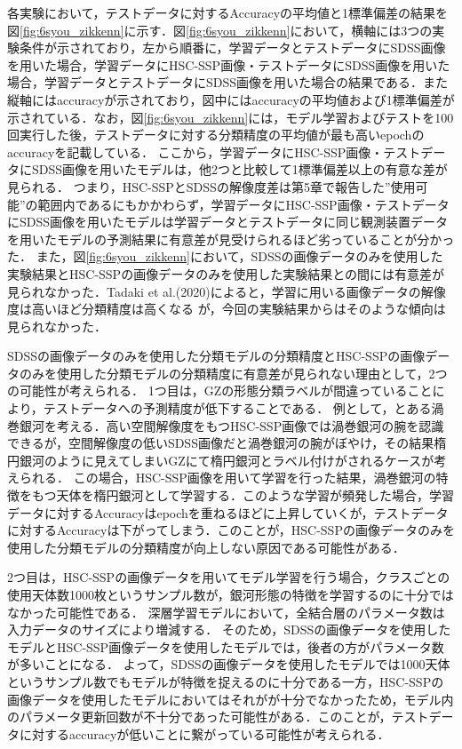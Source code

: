 \documentclass[a4j, 11pt]{jreport}
\begin{document}
各実験において，テストデータに対するAccuracyの平均値と1標準偏差の結果を図\ref{fig:6syou_zikkenn}に示す．図\ref{fig:6syou_zikkenn}において，横軸には3つの実験条件が示されており，左から順番に，学習データとテストデータにSDSS画像を用いた場合，学習データにHSC-SSP画像・テストデータにSDSS画像を用いた場合，学習データとテストデータにSDSS画像を用いた場合の結果である．また縦軸にはaccuracyが示されており，図中にはaccuracyの平均値および1標準偏差が示されている．なお，図\ref{fig:6syou_zikkenn}には，モデル学習およびテストを100回実行した後，テストデータに対する分類精度の平均値が最も高いepochのaccuracyを記載している．
ここから，学習データにHSC-SSP画像・テストデータにSDSS画像を用いたモデルは，他2つと比較して1標準偏差以上の有意な差が見られる．
つまり，HSC-SSPとSDSSの解像度差は第5章で報告した''使用可能''の範囲内であるにもかかわらず，学習データにHSC-SSP画像・テストデータにSDSS画像を用いたモデルは学習データとテストデータに同じ観測装置データを用いたモデルの予測結果に有意差が見受けられるほど劣っていることが分かった．
また，図\ref{fig:6syou_zikkenn}において，SDSSの画像データのみを使用した実験結果とHSC-SSPの画像データのみを使用した実験結果との間には有意差が見られなかった．Tadaki et al.(2020)によると，学習に用いる画像データの解像度は高いほど分類精度は高くなる
が，今回の実験結果からはそのような傾向は見られなかった．

SDSSの画像データのみを使用した分類モデルの分類精度とHSC-SSPの画像データのみを使用した分類モデルの分類精度に有意差が見られない理由として，2つの可能性が考えられる．
1つ目は，GZの形態分類ラベルが間違っていることにより，テストデータへの予測精度が低下することである．
例として，とある渦巻銀河を考える．高い空間解像度をもつHSC-SSP画像では渦巻銀河の腕を認識できるが，空間解像度の低いSDSS画像だと渦巻銀河の腕がぼやけ，その結果楕円銀河のように見えてしまいGZにて楕円銀河とラベル付けがされるケースが考えられる．
この場合，HSC-SSP画像を用いて学習を行った結果，渦巻銀河の特徴をもつ天体を楕円銀河として学習する．このような学習が頻発した場合，学習データに対するAccuracyはepochを重ねるほどに上昇していくが，テストデータに対するAccuracyは下がってしまう．このことが，HSC-SSPの画像データのみを使用した分類モデルの分類精度が向上しない原因である可能性がある．

2つ目は，HSC-SSPの画像データを用いてモデル学習を行う場合，クラスごとの使用天体数1000枚というサンプル数が，銀河形態の特徴を学習するのに十分ではなかった可能性である．
深層学習モデルにおいて，全結合層のパラメータ数は入力データのサイズにより増減する．
そのため，SDSSの画像データを使用したモデルとHSC-SSP画像データを使用したモデルでは，後者の方がパラメータ数が多いことになる．
よって，SDSSの画像データを使用したモデルでは1000天体というサンプル数でもモデルが特徴を捉えるのに十分である一方，HSC-SSPの画像データを使用したモデルにおいてはそれがが十分でなかったため，モデル内のパラメータ更新回数が不十分であった可能性がある．このことが，テストデータに対するaccuracyが低いことに繋がっている可能性が考えられる．
\end{document}
